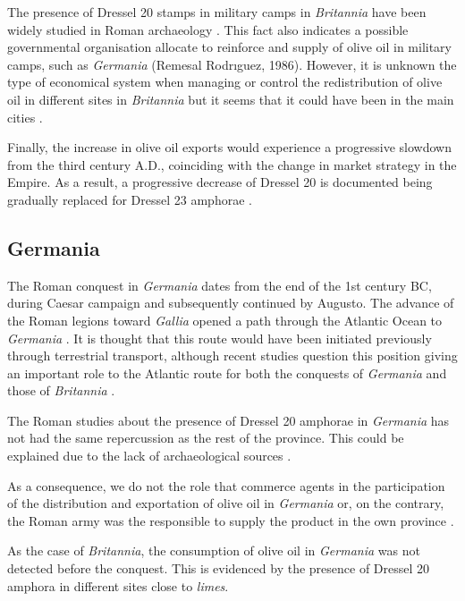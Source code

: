 \documentclass[review]{elsarticle}
\begin{document}
The presence of Dressel 20 stamps in military camps in \textit{Britannia} have been widely studied in Roman archaeology \citep{carreras_britannia_1998}. This fact also indicates a possible governmental organisation allocate to reinforce and supply of olive oil in military camps, such as \textit{Germania} (Remesal Rodrıguez, 1986). However, it is unknown the type of economical system when managing or control the redistribution of olive oil in different sites in \textit{Britannia} but it seems that it could have been in the main cities \citep[45]{funari_economic_2005}.

Finally, the increase in olive oil exports would experience a progressive slowdown from the third century A.D., coinciding with the change in market strategy in the Empire. As a result, a progressive decrease of Dressel 20 is documented being gradually replaced for Dressel 23 amphorae \citep{rodriguez1991aceite,millet_anforas_1998}.


\subsection{Germania}

The Roman conquest in \textit{Germania} dates from the end of the 1st century BC, during Caesar campaign and subsequently continued by Augusto. The advance of the Roman legions toward \textit{Gallia} opened a path through the Atlantic Ocean to \textit{Germania} \citep{remesal_annona_1986,
remesal_baetica_2002}. It is thought that this route would have been initiated previously through terrestrial transport, although recent studies question this position giving an important role to the Atlantic route for both the conquests of \textit{Germania} and those of \textit{Britannia} \citep{remesal_germn_2010,rubio-campillo_ecology_2018}.

The Roman studies about the presence of Dressel 20 amphorae in \textit{Germania} has not had the same repercussion as the rest of the province. This could be explained due to the lack of archaeological sources \citep{horacio2010llegada}.
  
As a consequence, we do not the role that commerce agents in the participation of the distribution and exportation of olive oil in \textit{Germania} or, on the contrary, the Roman army was the responsible to supply the product in the own province \citep[156]{remesal_germn_2010}. 

As the case of \textit{Britannia}, the consumption of olive oil in \textit{Germania} was not detected before the conquest. This is evidenced by the presence of Dressel 20 amphora in different sites close to \textit{limes}. 
\end{document}
